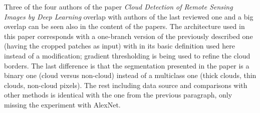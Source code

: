 Three of the four authors of the paper \textit{Cloud Detection of Remote Sensing Images by Deep Learning} overlap with authors of the last reviewed one and a big overlap can be seen also in the content of the papers. The architecture used in this paper corresponds with a one-branch version of the previously described one (having the cropped patches as input) with  in its basic definition used here instead of a modification; gradient thresholding is being used to refine the cloud borders. The last difference is that the segmentation presented in the paper is a binary one (cloud versus non-cloud) instead of a multiclass one (thick clouds, thin clouds, non-cloud pixels). The rest including data source and comparisons with other methods is identical with the one from the previous paragraph, only missing the experiment with AlexNet.




%
%
%
%
